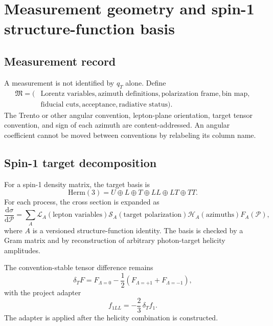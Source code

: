 \documentclass[11pt]{article}
\newcommand{\dd}{\mathrm{d}}
\newcommand{\cS}{\mathcal S}
\newcommand{\cH}{\mathcal H}
\newcommand{\cL}{\mathcal L}
\newcommand{\cP}{\mathcal P}
\begin{document}
\section{Measurement geometry and spin-1 structure-function basis}
\label{sec:measurement}

\subsection{Measurement record}

A measurement is not identified by \(q_T\) alone.  Define
\begin{equation}
\begin{aligned}
 \mathfrak M=\bigl(&
 \text{Lorentz variables},
 \text{azimuth definitions},
 \text{polarization frame},
 \text{bin map},\\
 &\text{fiducial cuts},
 \text{acceptance},
 \text{radiative status}
 \bigr).
\end{aligned}
 \label{eq:measurement-record}
\end{equation}
The Trento or other angular convention, lepton-plane orientation, target tensor convention, and sign of each azimuth are content-addressed.  An angular coefficient cannot be moved between conventions by relabeling its column name.

\subsection{Spin-1 target decomposition}

For a spin-1 density matrix, the target basis is
\begin{equation}
 \mathrm{Herm}(3)=U\oplus L\oplus T\oplus LL\oplus LT\oplus TT.
 \label{eq:target-basis}
\end{equation}
For each process, the cross section is expanded as
\begin{equation}
 \frac{\dd\sigma}{\dd\cP}
 =\sum_A \cL_A(\text{lepton variables})
 \cS_A(\text{target polarization})
 \cH_A(\text{azimuths})
 F_A(\cP),
 \label{eq:structure-function-expansion}
\end{equation}
where \(A\) is a versioned structure-function identity.  The basis is checked by a Gram matrix and by reconstruction of arbitrary photon-target helicity amplitudes.

The convention-stable tensor difference remains
\begin{equation}
 \delta_TF=F_{\Lambda=0}-\frac12(F_{\Lambda=+1}+F_{\Lambda=-1}),
 \label{eq:tensor-difference}
\end{equation}
with the project adapter
\begin{equation}
 f_{1LL}=-\frac23\,\delta_Tf_1.
 \label{eq:ll-adapter}
\end{equation}
The adapter is applied after the helicity combination is constructed.
\end{document}
